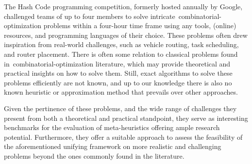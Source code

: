 The Hash Code programming competition, formerly hosted annually by Google,
challenged teams of up to four members to solve
intricate~\acrshort{combinatorial-optimization} problems within a four-hour time
frame using any tools, (online) resources, and programming languages of their
choice. These problems often drew inspiration from real-world challenges, such
as vehicle routing, task scheduling, and router placement. There is often some
relation to classical problems found in~\acrshort{combinatorial-optimization}
literature, which may provide theoretical and practical insights on how to solve
them. Still, exact algorithms to solve these problems efficiently are not known,
and up to our knowledge there is also no known heuristic or approximation method
that prevails over other approaches.

Given the pertinence of these problems, and the wide range of challenges they
present from both a theoretical and practical standpoint, they serve as
interesting benchmarks for the evaluation of meta-heuristics offering ample
research potential. Furthermore, they offer a suitable approach to assess the
feasibility of the aforementioned unifying framework on more realistic and
challenging problems beyond the ones commonly found in the literature.